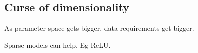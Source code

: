 
\subsection{Curse of dimensionality}

As parameter space gets bigger, data requirements get bigger.

Sparse models can help. Eg ReLU.